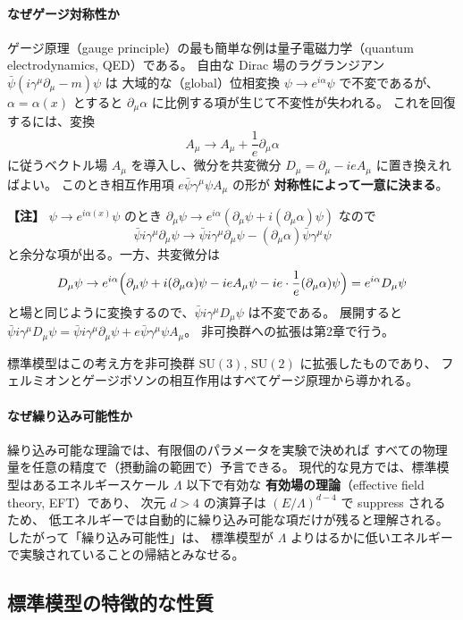 \documentclass[uplatex,dvipdfmx,a4paper,11pt,openany]{jsbook}
\newcommand{\term}[2]{\textbf{#1}（#2）}
\newcommand{\en}[1]{（#1）}
\newenvironment{note}{\vspace{1ex}\par\footnotesize\noindent\textbf{【注】}}{\par\vspace{1ex}}
\numberwithin{equation}{chapter}
\theoremstyle{definition}
\theoremstyle{plain}
\theoremstyle{remark}
\newcommand{\SU}{\mathrm{SU}}
\begin{document}
\paragraph{なぜゲージ対称性か}
ゲージ原理\en{gauge principle}の最も簡単な例は量子電磁力学\en{quantum electrodynamics, QED}である。
自由な Dirac 場のラグランジアン $\bar\psi(i\gamma^\mu\partial_\mu-m)\psi$ は
大域的な\en{global}位相変換 $\psi\to e^{i\alpha}\psi$ で不変であるが、
$\alpha=\alpha(x)$ とすると $\partial_\mu\alpha$ に比例する項が生じて不変性が失われる。
これを回復するには、変換
\begin{equation}
A_\mu\to A_\mu+\frac1e\partial_\mu\alpha
\end{equation}
に従うベクトル場 $A_\mu$ を導入し、微分を共変微分 $D_\mu=\partial_\mu-ieA_\mu$ に置き換えればよい。
このとき相互作用項 $e\bar\psi\gamma^\mu\psi A_\mu$ の形が
\textbf{対称性によって一意に決まる}。
\begin{note}
$\psi\to e^{i\alpha(x)}\psi$ のとき
$\partial_\mu\psi\to e^{i\alpha}\left(\partial_\mu\psi+i(\partial_\mu\alpha)\psi\right)$ なので
\[
\bar\psi i\gamma^\mu\partial_\mu\psi
\to
\bar\psi i\gamma^\mu\partial_\mu\psi-(\partial_\mu\alpha)\bar\psi\gamma^\mu\psi
\]
と余分な項が出る。一方、共変微分は
\[
D_\mu\psi
\to
e^{i\alpha}\Bigl(
\partial_\mu\psi+i(\partial_\mu\alpha)\psi
-ieA_\mu\psi-ie\cdot\frac1e(\partial_\mu\alpha)\psi
\Bigr)
=e^{i\alpha}D_\mu\psi
\]
と場と同じように変換するので、$\bar\psi i\gamma^\mu D_\mu\psi$ は不変である。
展開すると $\bar\psi i\gamma^\mu D_\mu\psi=\bar\psi i\gamma^\mu\partial_\mu\psi+e\bar\psi\gamma^\mu\psi A_\mu$。
非可換群への拡張は第2章で行う。
\end{note}
標準模型はこの考え方を非可換群 $\SU(3)$, $\SU(2)$ に拡張したものであり、
フェルミオンとゲージボソンの相互作用はすべてゲージ原理から導かれる。
\paragraph{なぜ繰り込み可能性か}
繰り込み可能な理論では、有限個のパラメータを実験で決めれば
すべての物理量を任意の精度で（摂動論の範囲で）予言できる。
現代的な見方では、標準模型はあるエネルギースケール $\Lambda$ 以下で有効な
\term{有効場の理論}{effective field theory, EFT}であり、
次元 $d>4$ の演算子は $(E/\Lambda)^{d-4}$ で suppress されるため、
低エネルギーでは自動的に繰り込み可能な項だけが残ると理解される。
したがって「繰り込み可能性」は、
標準模型が $\Lambda$ よりはるかに低いエネルギーで実験されていることの帰結とみなせる。
\subsection{標準模型の特徴的な性質}
\end{document}
